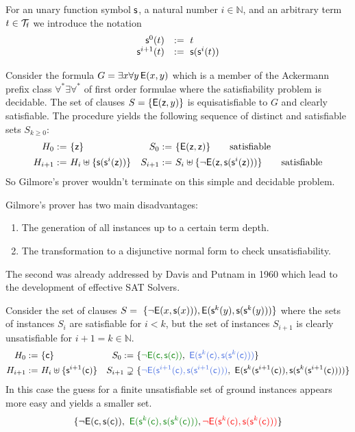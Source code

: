 \begin{definition}
	For an unary function symbol ${\mathsf s}$, a natural number
	$i\in\mathbb{N}$, and an arbitrary term $t\in{\mathcal T}_{\mathsf f}$ we introduce the notation
	\[
	\begin{array}{rl}
	{\mathsf s}^0(t) &:=\ t \\
	{\mathsf s}^{i+1}(t) &:=\ {\mathsf s}({\mathsf s}^i(t))
	\end{array}
	\]
\end{definition}

\begin{example}
	Consider the formula 
	$G = \exists x\forall y\,{\mathsf{E}}(x,y)$
	which is a member of the Ackermann prefix class $\forall^*\exists\forall^*$ 
	of first order formulae
	where the satisfiability problem is decidable.
	The set of clauses 
	$S = \{ {\mathsf{E}}({\mathsf z},y) \}$ is equisatisfiable to $G$ and clearly satisfiable.
	The procedure yields the following sequence of distinct and satisfiable sets $S_{k\geq0}$:
	\begin{align*}
	H_{0} :=&\  \{ {\mathsf z} \} 
	&
	S_{0} :=&\ \{ {\mathsf{E}}({\mathsf z},{\mathsf z})
	\}
	\tag*{satisfiable}
	\\
	H_{i+1} :=&\ H_i \uplus \{ {\mathsf s}({\mathsf s}^{i}({\mathsf z})) \} 
	&
	S_{i+1} :=&\ S_i \uplus 
	\{
	\lnot{\mathsf{E}}({\mathsf z},{\mathsf s}({\mathsf s}^i({\mathsf z})))
	\}
	\tag*{satisfiable}
	\end{align*}
	So Gilmore's prover wouldn't terminate on this simple and decidable problem.
\end{example}



Gilmore's prover has two main disadvantages:
\begin{enumerate}
	\item The generation of all instances up to a certain term depth.
	\item The transformation to a disjunctive normal form to check unsatisfiability.
\end{enumerate}

The second was already addressed by Davis and Putnam in 1960
which lead to the development of effective SAT Solvers.

\begin{example}\label{ex:unsatE2}
	Consider the set of clauses 
	$S =\
	\{
	{ \lnot{\mathsf{E}}(x, {\mathsf s}(x)))}, 
	{ {\mathsf{E}}({\mathsf s}^k(y), {\mathsf s}({\mathsf s}^k(y)))}
	\}$ 
	where the sets of instances $S_i$ are satisfiable for $i<k$,
	but the set of instances $S_{i+1}$ is clearly unsatisfiable for $i+1 = k\in\mathbb{N}$.
%	
\begin{align*}
H_{0} :=&\  \{ \mc \} 
&
S_{0} :=&\ \{ 
{\colHi\lnot\mE(\mc,\msucc(\mc))},\
{\colEm \mE(\ms^k(\mc), \ms(\ms^k(\mc)))}
\}
\\
H_{i+1} :=&\ H_i \disjointunion \{ \msucc^{i+1}(\mc) \} 
&
S_{i+1} \supsetneq&\
\{
{\colEm \lnot\mE(\msucc^{i+1}(\mc),\msucc(\msucc^{i+1}(\mc)))},\
{\mE(\ms^k(\msucc^{i+1}(\mc)), \ms(\ms^k(\msucc^{i+1}(\mc))))}
\}
\end{align*}
In this case the guess for a finite unsatisfiable set of ground instances appears more easy and yields a smaller set.
\[
	\{ 
		{\lnot\mE(\mc,\msucc(\mc))},\
		{\colHi \mE(\ms^k(\mc), \ms(\ms^k(\mc)))},
		{\colLo \lnot\mE(\msucc^{k}(\mc),\msucc(\msucc^{k}(\mc)))}		
	\}
\]
\end{example}

